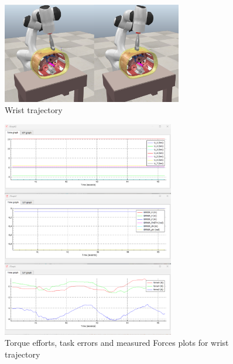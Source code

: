 \documentclass{article}
\begin{document}
\begin{figure}[H]
    \centering
    \includegraphics[width=0.7\textwidth]{wrist_traj.png}  
    \caption{Wrist trajectory}
    \label{wrist_traj}
\end{figure}

\begin{figure}[H]
    \centering
    \includegraphics[width=0.67\textwidth]{wrist_graphs.png}  
    \caption{Torque efforts, task errors and measured Forces plots for wrist trajectory}
    \label{wrist_graphs}
\end{figure}
\end{document}
